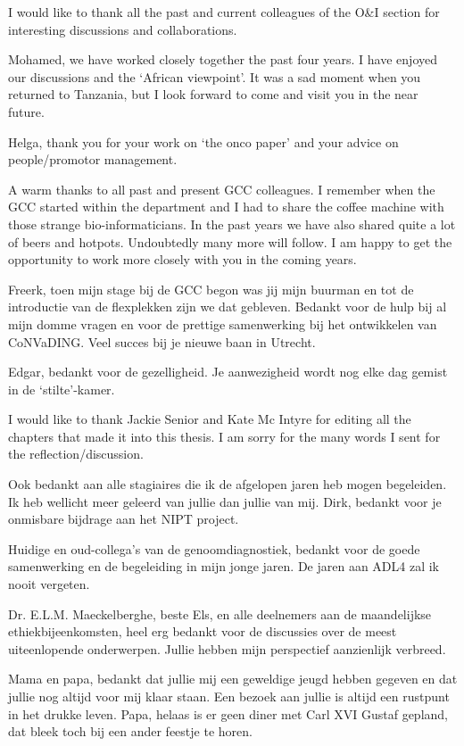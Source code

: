 \begin{appendices}
I would like to thank all the past and current colleagues of the O&I section for interesting discussions and collaborations. 

Mohamed, we have worked closely together the past four years. I have enjoyed our discussions and the ‘African viewpoint’. It was a sad moment when you returned to Tanzania, but I look forward to come and visit you in the near future. 

Helga, thank you for your work on ‘the onco paper’ and your advice on people/promotor management.

A warm thanks to all past and present GCC colleagues. I remember when the GCC started within the department and I had to share the coffee machine with those strange bio-informaticians. In the past years we have also shared quite a lot of beers and hotpots. Undoubtedly many more will follow. I am happy to get the opportunity to work more closely with you in the coming years.

Freerk, toen mijn stage bij de GCC begon was jij mijn buurman en tot de introductie van de flexplekken zijn we dat gebleven. Bedankt voor de hulp bij al mijn domme vragen en voor de prettige samenwerking bij het ontwikkelen van CoNVaDING. Veel succes bij je nieuwe baan in Utrecht.

Edgar, bedankt voor de gezelligheid. Je aanwezigheid wordt nog elke dag gemist in de ‘stilte’-kamer.

I would like to thank Jackie Senior and Kate Mc Intyre for editing all the chapters that made it into this thesis. I am sorry for the many words I sent for the reflection/discussion. 

Ook bedankt aan alle stagiaires die ik de afgelopen jaren heb mogen begeleiden. Ik heb wellicht meer geleerd van jullie dan jullie van mij. Dirk, bedankt voor je onmisbare bijdrage aan het NIPT project.

Huidige en oud-collega’s van de genoomdiagnostiek, bedankt voor de goede samenwerking en de begeleiding in mijn jonge jaren. De jaren aan ADL4 zal ik nooit vergeten. 

Dr. E.L.M. Maeckelberghe, beste Els, en alle deelnemers aan de maandelijkse ethiekbijeenkomsten, heel erg bedankt voor de discussies over de meest uiteenlopende onderwerpen.  Jullie hebben mijn perspectief aanzienlijk verbreed.

Mama en papa, bedankt dat jullie mij een geweldige jeugd hebben gegeven en dat jullie nog altijd voor mij klaar staan. Een bezoek aan jullie is altijd een rustpunt in het drukke leven. Papa, helaas is er geen diner met Carl XVI Gustaf gepland, dat bleek toch bij een ander feestje te horen.


\end{appendices}
